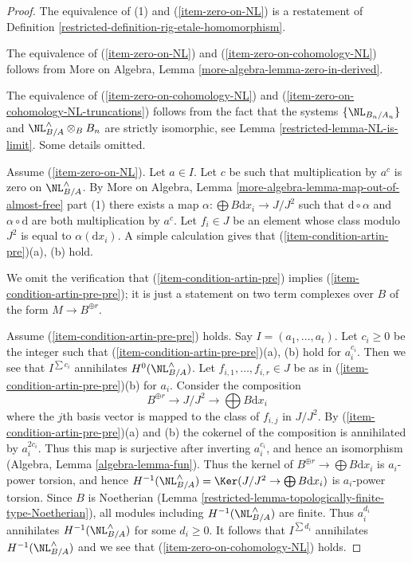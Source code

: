 \begin{proof}

The equivalence of (1) and (\ref{item-zero-on-NL}) is a restatement of
Definition \ref{restricted-definition-rig-etale-homomorphism}.

\medskip\noindent
The equivalence of (\ref{item-zero-on-NL}) and
(\ref{item-zero-on-cohomology-NL}) follows from
More on Algebra, Lemma \ref{more-algebra-lemma-zero-in-derived}.

\medskip\noindent
The equivalence of (\ref{item-zero-on-cohomology-NL})
and (\ref{item-zero-on-cohomology-NL-truncations}) follows from the fact that
the systems $\{\NL_{B_n/A_n}\}$ and $\NL_{B/A}^\wedge \otimes_B B_n$
are strictly isomorphic, see Lemma \ref{restricted-lemma-NL-is-limit}.
Some details omitted.

\medskip\noindent
Assume (\ref{item-zero-on-NL}). Let $a \in I$.
Let $c$ be such that multiplication by $a^c$ is zero on $\NL_{B/A}^\wedge$. By
More on Algebra, Lemma \ref{more-algebra-lemma-map-out-of-almost-free}
part (1) there exists a map $\alpha : \bigoplus B\text{d}x_i \to J/J^2$
such that $\text{d} \circ \alpha$ and $\alpha \circ \text{d}$ are both
multiplication by $a^c$. Let $f_i \in J$ be an element whose
class modulo $J^2$ is equal to $\alpha(\text{d}x_i)$.
A simple calculation gives that (\ref{item-condition-artin-pre})(a), (b) hold.

\medskip\noindent
We omit the verification that (\ref{item-condition-artin-pre})
implies (\ref{item-condition-artin-pre-pre}); it is just a statement
on two term complexes over $B$ of the form $M \to B^{\oplus r}$.

\medskip\noindent
Assume (\ref{item-condition-artin-pre-pre}) holds.
Say $I = (a_1, \ldots, a_t)$. Let $c_i \geq 0$ be the integer such that
(\ref{item-condition-artin-pre-pre})(a), (b)
hold for $a_i^{c_i}$. Then we see that $I^{\sum c_i}$ annihilates
$H^0(\NL_{B/A}^\wedge)$. Let $f_{i, 1}, \ldots, f_{i, r} \in J$
be as in (\ref{item-condition-artin-pre-pre})(b) for $a_i$.
Consider the composition
$$
B^{\oplus r} \to J/J^2 \to \bigoplus B\text{d}x_i
$$
where the $j$th basis vector is mapped to the class of $f_{i, j}$ in $J/J^2$.
By (\ref{item-condition-artin-pre-pre})(a) and (b) the cokernel of the
composition is annihilated by $a_i^{2c_i}$. Thus this map is surjective
after inverting $a_i^{c_i}$, and hence an isomorphism
(Algebra, Lemma \ref{algebra-lemma-fun}).
Thus the kernel of $B^{\oplus r} \to \bigoplus B\text{d}x_i$ is
$a_i$-power torsion, and hence
$H^{-1}(\NL_{B/A}^\wedge) = \Ker(J/J^2 \to \bigoplus B\text{d}x_i)$
is $a_i$-power torsion. Since $B$ is Noetherian
(Lemma \ref{restricted-lemma-topologically-finite-type-Noetherian}),
all modules including $H^{-1}(\NL_{B/A}^\wedge)$ are finite.
Thus $a_i^{d_i}$ annihilates $H^{-1}(\NL_{B/A}^\wedge)$ for some $d_i \geq 0$.
It follows that $I^{\sum d_i}$ annihilates $H^{-1}(\NL_{B/A}^\wedge)$
and we see that (\ref{item-zero-on-cohomology-NL}) holds.


\end{proof}
